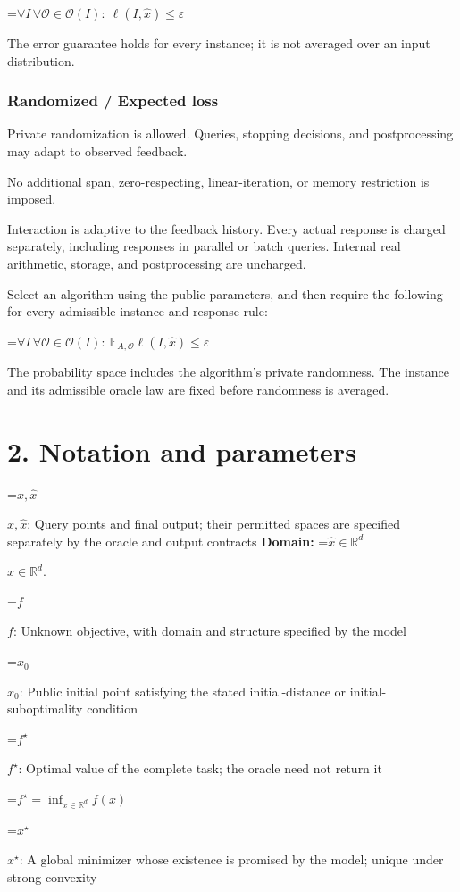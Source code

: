 \documentclass[10pt,a4paper]{article}
\newcommand{\AtlasMath}[1]{\par\begingroup\centering\setbox0=\hbox{$\displaystyle #1$}\ifdim\wd0>1.4\linewidth\typeout{ATLAS WIDE FORMULA: \the\wd0}\fi\ifdim\wd0>\linewidth\resizebox{\linewidth}{!}{\box0}\else\box0\fi\par\endgroup}
\newcommand{\AtlasInlineMath}[1]{\begingroup\setbox0=\hbox{$#1$}\ifdim\wd0>.4\linewidth\endgroup\AtlasMath{#1}\else\endgroup$#1$\fi}
\begin{document}
\AtlasMath{\forall I\,\forall\mathcal{O}\in\mathcal{O}(I):\ \ell(I,\widehat{x})\le\varepsilon}


The error guarantee holds for every instance; it is not averaged over an input distribution.

\subsubsection{Randomized / Expected loss}
Private randomization is allowed. Queries, stopping decisions, and postprocessing may adapt to observed feedback.

No additional span, zero-respecting, linear-iteration, or memory restriction is imposed.

Interaction is adaptive to the feedback history. Every actual response is charged separately, including responses in parallel or batch queries. Internal real arithmetic, storage, and postprocessing are uncharged.

Select an algorithm using the public parameters, and then require the following for every admissible instance and response rule:


\AtlasMath{\forall I\,\forall\mathcal{O}\in\mathcal{O}(I):\ \mathbb{E}_{A,\mathcal{O}}\ell(I,\widehat{x})\le\varepsilon}


The probability space includes the algorithm's private randomness. The instance and its admissible oracle law are fixed before randomness is averaged.

\section{2. Notation and parameters}
\AtlasInlineMath{x,\widehat{x}}: Query points and final output; their permitted spaces are specified separately by the oracle and output contracts \textbf{Domain:} \AtlasInlineMath{\widehat{x}\in \mathbb{R}^d}.

\AtlasInlineMath{f}: Unknown objective, with domain and structure specified by the model

\AtlasInlineMath{x_0}: Public initial point satisfying the stated initial-distance or initial-suboptimality condition

\AtlasInlineMath{f^\star}: Optimal value of the complete task; the oracle need not return it


\AtlasMath{f^\star=\inf_{x\in \mathbb{R}^d}f(x)}


\AtlasInlineMath{x^\star}: A global minimizer whose existence is promised by the model; unique under strong convexity
\end{document}
